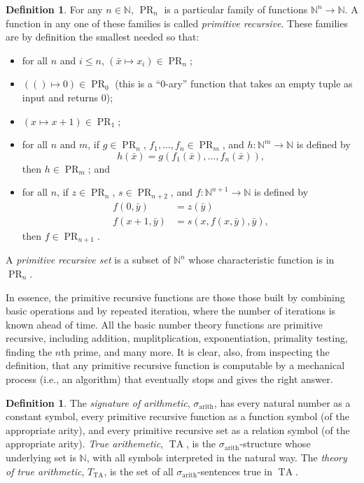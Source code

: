 \documentclass{article}
\theoremstyle{plain}
\theoremstyle{definition}
\newtheorem{defn}[thm]{Definition}
\newcommand{\defterm}{\emph}
\newcommand{\arithsig}{\sigma_{\operatorname{arith}}}
\newcommand{\tuple}{\bar}
\DeclareMathOperator{\PR}{PR}
\DeclareMathOperator{\TA}{TA}
\newcommand{\tathy}{T_{\TA}}
\begin{document}
\begin{defn}
  For any $n \in \mathbb{N}$, $\PR_n$ is a particular family of
  functions $\mathbb{N}^n \to \mathbb{N}$. A function in any one of
  these families is called \defterm{primitive recursive}. These
  families are by definition the smallest needed so that:
  \begin{itemize}
  \item for all $n$ and $i \leq n$, $\left(\tuple{x} \mapsto x_i\right) \in \PR_n$;
  \item $\left(() \mapsto 0\right) \in \PR_0$ (this is a ``0-ary''
    function that takes an empty tuple as input and returns 0);
  \item $\left(x \mapsto x + 1\right) \in \PR_1$;
  \item for all $n$ and $m$, if $g \in \PR_n$, $f_1,\ldots,f_n \in
    \PR_m$, and $h : \mathbb{N}^m \to \mathbb{N}$ is defined
    by $$h(\tuple{x}) =
    g(f_1(\tuple{x}),\ldots,f_n(\tuple{x}))\text{,}$$ then $h \in
    \PR_m$; and
  \item for all $n$, if $z \in \PR_n$, $s \in \PR_{n+2}$, and $f :
    \mathbb{N}^{n+1} \to \mathbb{N}$ is defined by
    \begin{align*}
      f(0,\tuple{y}) &= z(\tuple{y}) \\
      f(x+1,\tuple{y}) &= s(x,f(x,\tuple{y}),\tuple{y}) \text{,}
    \end{align*}
    then $f \in \PR_{n+1}$.
  \end{itemize}

  A \defterm{primitive recursive set} is a subset of $\mathbb{N}^n$
  whose characteristic function is in $\PR_n$.
\end{defn}

In essence, the primitive recursive functions are those those built by
combining basic operations and by repeated iteration, where the number
of iterations is known ahead of time. All the basic number theory
functions are primitive recursive, including addition,
muplitplication, exponentiation, primality testing, finding the $n$th
prime, and many more. It is clear, also, from inspecting the
definition, that any primitive recursive function is computable by a
mechanical process (i.e., an algorithm) that eventually stops and
gives the right answer.

\begin{defn}
  The \defterm{signature of arithmetic}, $\arithsig$, has every
  natural number as a constant symbol, every primitive recursive
  function as a function symbol (of the appropriate arity), and every
  primitive recursive set as a relation symbol (of the appropriate
  arity). \defterm{True arithemetic}, $\TA$, is the
  $\arithsig$-structure whose underlying set is $\mathbb{N}$, with all
  symbols interpreted in the natural way. The \defterm{theory of true
    arithmetic}, $\tathy$, is the set of all $\arithsig$-sentences
  true in $\TA$.
\end{defn}
\end{document}
